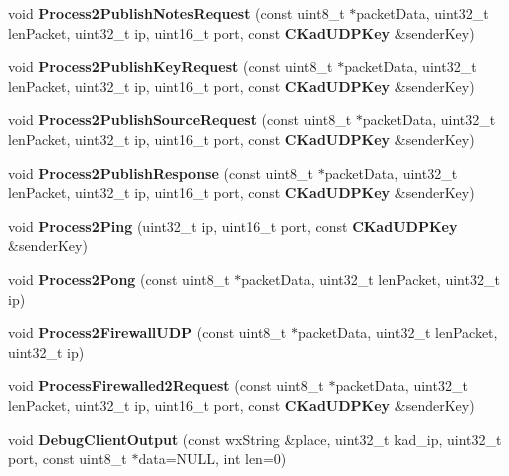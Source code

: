\begin{DoxyCompactItemize}
\item 
void {\bfseries Process2PublishNotesRequest} (const uint8\_\-t $\ast$packetData, uint32\_\-t lenPacket, uint32\_\-t ip, uint16\_\-t port, const {\bf CKadUDPKey} \&senderKey)\label{classKademlia_1_1CKademliaUDPListener_ae7ea39097940d688e0e01d213d65d585}

\item 
void {\bfseries Process2PublishKeyRequest} (const uint8\_\-t $\ast$packetData, uint32\_\-t lenPacket, uint32\_\-t ip, uint16\_\-t port, const {\bf CKadUDPKey} \&senderKey)\label{classKademlia_1_1CKademliaUDPListener_ad8be447e3ebcd3f002ecb58b96d29ca7}

\item 
void {\bfseries Process2PublishSourceRequest} (const uint8\_\-t $\ast$packetData, uint32\_\-t lenPacket, uint32\_\-t ip, uint16\_\-t port, const {\bf CKadUDPKey} \&senderKey)\label{classKademlia_1_1CKademliaUDPListener_a0c762e2e03b2f700b72b22a355ebb160}

\item 
void {\bfseries Process2PublishResponse} (const uint8\_\-t $\ast$packetData, uint32\_\-t lenPacket, uint32\_\-t ip, uint16\_\-t port, const {\bf CKadUDPKey} \&senderKey)\label{classKademlia_1_1CKademliaUDPListener_a18a36fb2bfd1af46f57956db6cc28e75}

\item 
void {\bfseries Process2Ping} (uint32\_\-t ip, uint16\_\-t port, const {\bf CKadUDPKey} \&senderKey)\label{classKademlia_1_1CKademliaUDPListener_ab712af2196a0952b7df84e6876635121}

\item 
void {\bfseries Process2Pong} (const uint8\_\-t $\ast$packetData, uint32\_\-t lenPacket, uint32\_\-t ip)\label{classKademlia_1_1CKademliaUDPListener_aa9a17a714a34b089d79bf09bd2d08c88}

\item 
void {\bfseries Process2FirewallUDP} (const uint8\_\-t $\ast$packetData, uint32\_\-t lenPacket, uint32\_\-t ip)\label{classKademlia_1_1CKademliaUDPListener_aed4bc29fce17a1d877daf502db80a95d}

\item 
void {\bfseries ProcessFirewalled2Request} (const uint8\_\-t $\ast$packetData, uint32\_\-t lenPacket, uint32\_\-t ip, uint16\_\-t port, const {\bf CKadUDPKey} \&senderKey)\label{classKademlia_1_1CKademliaUDPListener_aa7a96d311aa78d12ea73750f69686292}

\item 
void {\bfseries DebugClientOutput} (const wxString \&place, uint32\_\-t kad\_\-ip, uint32\_\-t port, const uint8\_\-t $\ast$data=NULL, int len=0)\label{classKademlia_1_1CKademliaUDPListener_a0ab8c119f52ef585c7abca385e01830d}

\end{DoxyCompactItemize}
